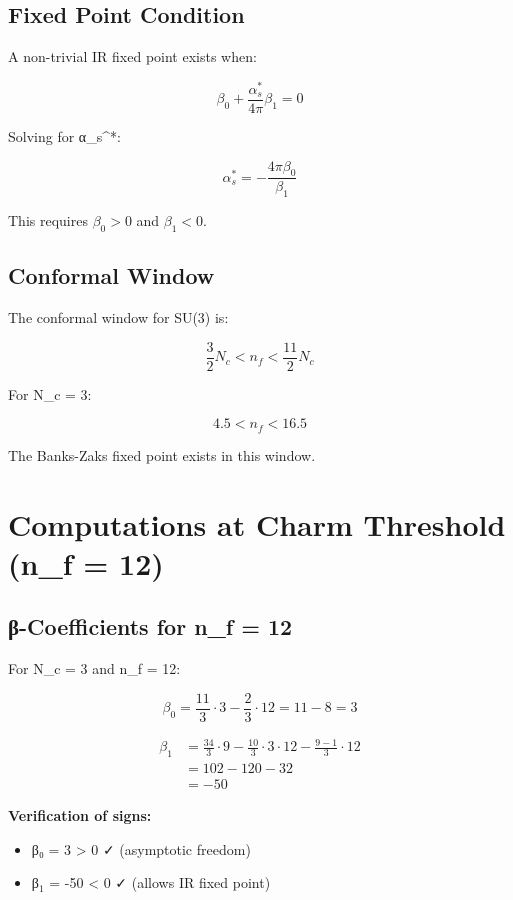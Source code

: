 \documentclass{article}
\begin{document}
\subsection{Fixed Point Condition}

A non-trivial IR fixed point exists when:

\[
\beta_0 + \frac{\alpha_s^*}{4\pi}\beta_1 = 0
\]

Solving for α_s^*:

\[
\alpha_s^* = -\frac{4\pi\beta_0}{\beta_1}
\]

This requires $\beta_0 > 0$ and $\beta_1 < 0$.

\subsection{Conformal Window}

The conformal window for SU(3) is:

\[
\frac{3}{2}N_c < n_f < \frac{11}{2}N_c
\]

For N_c = 3:

\[
4.5 < n_f < 16.5
\]

The Banks-Zaks fixed point exists in this window.

\section{Computations at Charm Threshold (n_f = 12)}

\subsection{β-Coefficients for n_f = 12}

For N_c = 3 and n_f = 12:

\[
\beta_0 = \frac{11}{3} \cdot 3 - \frac{2}{3} \cdot 12 = 11 - 8 = 3
\]

\[
\begin{aligned}
\beta_1 &= \frac{34}{3} \cdot 9 - \frac{10}{3} \cdot 3 \cdot 12 - \frac{9 - 1}{3} \cdot 12 \\
&= 102 - 120 - 32 \\
&= -50
\end{aligned}
\]

\textbf{Verification of signs:}
\begin{itemize}
\item β₀ = 3 > 0 ✓ (asymptotic freedom)
\item β$_1$ = -50 < 0 ✓ (allows IR fixed point)
\end{itemize}
\end{document}
